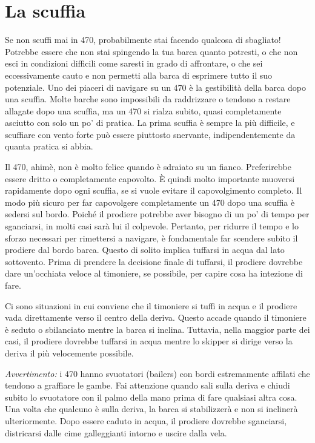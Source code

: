 
\chapter{La scuffia}
\label{ch:scuffia}
Se non scuffi mai in 470, probabilmente stai facendo qualcosa di sbagliato!
Potrebbe essere che non stai spingendo la tua barca quanto potresti, o che non
esci in condizioni difficili come saresti in grado di affrontare, o che sei
eccessivamente cauto e non permetti alla barca di esprimere tutto il suo
potenziale. Uno dei piaceri di navigare su un 470 è la gestibilità della barca
dopo una scuffia. Molte barche sono impossibili da raddrizzare o tendono a
restare allagate dopo una scuffia, ma un 470 si rialza subito, quasi
completamente asciutto con solo un po' di pratica. La prima scuffia è sempre la
più difficile, e scuffiare con vento forte può essere piuttosto snervante,
indipendentemente da quanta pratica si abbia.

Il 470, ahimè, non è molto felice quando è sdraiato su un fianco. Preferirebbe
essere dritto o completamente capovolto. È quindi molto importante muoversi
rapidamente dopo ogni scuffia, se si vuole evitare il capovolgimento completo.
Il modo più sicuro per far capovolgere completamente un 470 dopo una scuffia è
sedersi sul bordo. Poiché il prodiere potrebbe aver bisogno di un po' di
tempo per sganciarsi, in molti casi sarà lui il colpevole. Pertanto, per ridurre
il tempo e lo sforzo necessari per rimettersi a navigare, è fondamentale far
scendere subito il prodiere dal bordo barca. Questo di solito implica tuffarsi
in acqua dal lato sottovento. Prima di prendere la decisione finale di tuffarsi,
il prodiere dovrebbe dare un'occhiata veloce al timoniere, se possibile, per
capire cosa ha intezione di fare.

Ci sono situazioni in cui conviene che il timoniere si tuffi in acqua e il
prodiere vada direttamente verso il centro della deriva. Questo accade quando il
timoniere è seduto \leeward o sbilanciato mentre la barca si inclina. Tuttavia,
nella maggior parte dei casi, il prodiere dovrebbe tuffarsi in acqua mentre lo
skipper si dirige verso la deriva il più velocemente possibile.

\emph{Avvertimento:} i 470 hanno svuotatori (bailers) con bordi estremamente
affilati che tendono a graffiare le gambe. Fai attenzione quando sali sulla
deriva e chiudi subito lo svuotatore con il palmo della mano prima di fare
qualsiasi altra cosa. Una volta che qualcuno è sulla deriva, la barca si
stabilizzerà e non si inclinerà ulteriormente. Dopo essere caduto in acqua,
il prodiere dovrebbe sganciarsi, districarsi dalle cime galleggianti intorno e
uscire dalla vela.

